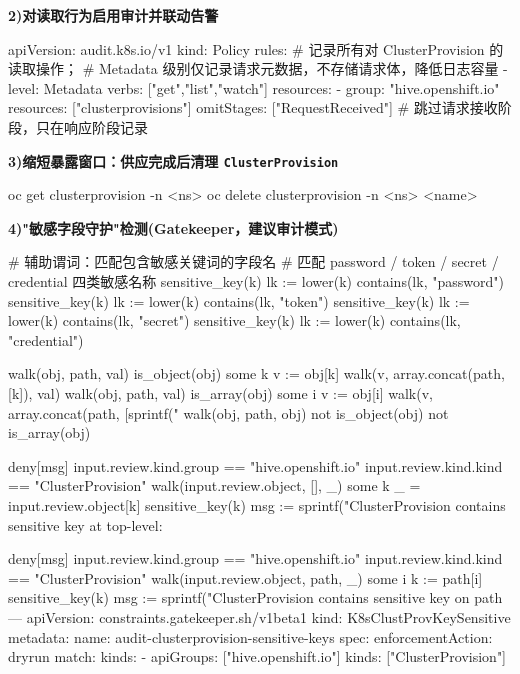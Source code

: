 \textbf{2)对读取行为启用审计并联动告警}
\begin{AppendixCode}
apiVersion: audit.k8s.io/v1
kind: Policy
rules:
# 记录所有对 ClusterProvision 的读取操作；
# Metadata 级别仅记录请求元数据，不存储请求体，降低日志容量
- level: Metadata
  verbs: ["get","list","watch"]
  resources:
  - group: "hive.openshift.io"
    resources: ["clusterprovisions"]
  omitStages: ["RequestReceived"]  # 跳过请求接收阶段，只在响应阶段记录
\end{AppendixCode}

\textbf{3)缩短暴露窗口：供应完成后清理 \texttt{ClusterProvision}}
\begin{AppendixCode}
oc get clusterprovision -n <ns>
oc delete clusterprovision -n <ns> <name>
\end{AppendixCode}

\textbf{4)"敏感字段守护"检测(Gatekeeper，建议审计模式)}
\begin{AppendixCode}
# 辅助谓词：匹配包含敏感关键词的字段名
# 匹配 password / token / secret / credential 四类敏感名称
sensitive_key(k) {
        lk := lower(k)
        contains(lk, "password")
      }
      sensitive_key(k) {
        lk := lower(k)
        contains(lk, "token")
      }
      sensitive_key(k) {
        lk := lower(k)
        contains(lk, "secret")
      }
      sensitive_key(k) {
        lk := lower(k)
        contains(lk, "credential")
      }

      walk(obj, path, val) {
        is_object(obj)
        some k
        v := obj[k]
        walk(v, array.concat(path, [k]), val)
      }
      walk(obj, path, val) {
        is_array(obj)
        some i
        v := obj[i]
        walk(v, array.concat(path, [sprintf("%
      }
      walk(obj, path, obj) {
        not is_object(obj)
        not is_array(obj)
      }

      deny[msg] {
        input.review.kind.group == "hive.openshift.io"
        input.review.kind.kind == "ClusterProvision"
        walk(input.review.object, [], _)
        some k
        _ = input.review.object[k]
        sensitive_key(k)
        msg := sprintf("ClusterProvision contains sensitive key at top-level: %
      }

      deny[msg] {
        input.review.kind.group == "hive.openshift.io"
        input.review.kind.kind == "ClusterProvision"
        walk(input.review.object, path, _)
        some i
        k := path[i]
        sensitive_key(k)
        msg := sprintf("ClusterProvision contains sensitive key on path %
      }
---
apiVersion: constraints.gatekeeper.sh/v1beta1
kind: K8sClustProvKeySensitive
metadata:
  name: audit-clusterprovision-sensitive-keys
spec:
  enforcementAction: dryrun
  match:
    kinds:
    - apiGroups: ["hive.openshift.io"]
      kinds: ["ClusterProvision"]
\end{AppendixCode}


